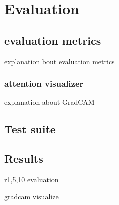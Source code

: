 \chapter{Evaluation}

\section{evaluation metrics}
explanation bout evaluation metrics

\subsection{attention visualizer}
explanation about GradCAM

\section{Test suite}

\section{Results}

r1,5,10 evaluation

gradcam visualize